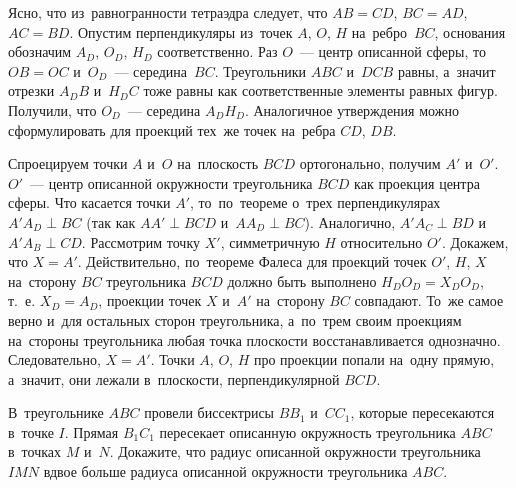 \ifincludesolutions
Ясно, что из~равногранности тетраэдра следует, что $AB = CD$, $BC = AD$,
$AC = BD$.
Опустим перпендикуляры из~точек $A$, $O$, $H$ на~ребро~$BC$, основания
обозначим $A_D$, $O_D$, $H_D$ соответственно.
Раз $O$~--- центр описанной сферы, то~$OB = OC$ и~$O_D$~--- середина~$BC$.
Треугольники $ABC$ и~$DCB$ равны, а~значит отрезки $A_D B$ и~$H_D C$ тоже равны
как соответственные элементы равных фигур.
Получили, что $O_D$~--- середина $A_D H_D$.
Аналогичное утверждения можно сформулировать для проекций тех~же точек
на~ребра $CD$, $DB$.
\par
Спроецируем точки $A$ и~$O$ на~плоскость $BCD$ ортогонально, получим
$A'$ и~$O'$.
$O'$~--- центр описанной окружности треугольника $BCD$ как проекция центра
сферы.
Что касается точки $A'$, то~по~теореме о~трех перпендикулярах $A' A_D \perp BC$
(так как $AA' \perp BCD$ и~$A A_D \perp BC$).
Аналогично, $A' A_C \perp BD$ и~$A' A_B \perp CD$.
Рассмотрим точку $X'$, симметричную $H$ относительно $O'$.
Докажем, что $X = A'$.
Действительно, по~теореме Фалеса для проекций точек $O'$, $H$, $X$ на~сторону
$BC$ треугольника $BCD$ должно быть выполнено $H_DO_D = X_DO_D$, т.~е.
$X_D = A_D$, проекции точек $X$ и~$A'$ на~сторону $BC$ совпадают.
То~же самое верно и~для остальных сторон треугольника, а~по~трем своим
проекциям на~стороны треугольника любая точка плоскости восстанавливается
однозначно.
Следовательно, $X = A'$.
Точки $A$, $O$, $H$ про проекции попали на~одну прямую, а~значит, они лежали
в~плоскости, перпендикулярной $BCD$.
\fi %

\begin{problems}

\item
В~треугольнике $ABC$ провели биссектрисы $B B_1$ и~$C C_1$, которые
пересекаются в~точке $I$.
Прямая $B_1 C_1$ пересекает описанную окружность треугольника $ABC$
в~точках $M$ и~$N$.
Докажите, что радиус описанной окружности треугольника $IMN$ вдвое больше
радиуса описанной окружности треугольника $ABC$.

\end{problems}

